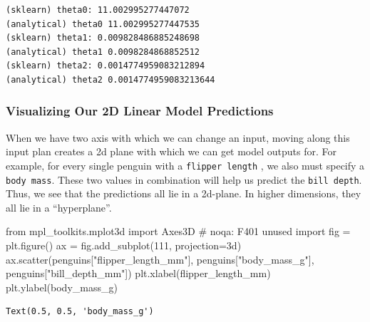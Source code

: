 \documentclass[
  letterpaper,
  DIV=11,
  numbers=noendperiod]{scrreprt}
\newenvironment{Shaded}{\begin{snugshade}}{\end{snugshade}}
\newcommand{\CommentTok}[1]{\textcolor[rgb]{0.37,0.37,0.37}{#1}}
\newcommand{\DecValTok}[1]{\textcolor[rgb]{0.68,0.00,0.00}{#1}}
\newcommand{\ImportTok}[1]{\textcolor[rgb]{0.00,0.46,0.62}{#1}}
\newcommand{\NormalTok}[1]{\textcolor[rgb]{0.00,0.23,0.31}{#1}}
\newcommand{\OperatorTok}[1]{\textcolor[rgb]{0.37,0.37,0.37}{#1}}
\newcommand{\StringTok}[1]{\textcolor[rgb]{0.13,0.47,0.30}{#1}}
\begin{document}
\begin{verbatim}
(sklearn) theta0: 11.002995277447072
(analytical) theta0 11.002995277447535
(sklearn) theta1: 0.009828486885248698
(analytical) theta1 0.0098284868852512
(sklearn) theta2: 0.0014774959083212894
(analytical) theta2 0.0014774959083213644
\end{verbatim}

\hypertarget{visualizing-our-2d-linear-model-predictions}{%
\subsubsection{Visualizing Our 2D Linear Model
Predictions}\label{visualizing-our-2d-linear-model-predictions}}

When we have two axis with which we can change an input, moving along
this input plan creates a 2d plane with which we can get model outputs
for. For example, for every single penguin with a
\texttt{flipper\ length} , we also must specify a \texttt{body\ mass}.
These two values in combination will help us predict the
\texttt{bill\ depth}. Thus, we see that the predictions all lie in a
2d-plane. In higher dimensions, they all lie in a ``hyperplane''.

\begin{Shaded}
\begin{Highlighting}[]
\ImportTok{from}\NormalTok{ mpl\_toolkits.mplot3d }\ImportTok{import}\NormalTok{ Axes3D  }\CommentTok{\# noqa: F401 unused import}
\NormalTok{fig }\OperatorTok{=}\NormalTok{ plt.figure()}
\NormalTok{ax }\OperatorTok{=}\NormalTok{ fig.add\_subplot(}\DecValTok{111}\NormalTok{, projection}\OperatorTok{=}\StringTok{\textquotesingle{}3d\textquotesingle{}}\NormalTok{)}
\NormalTok{ax.scatter(penguins[}\StringTok{"flipper\_length\_mm"}\NormalTok{], penguins[}\StringTok{"body\_mass\_g"}\NormalTok{], penguins[}\StringTok{"bill\_depth\_mm"}\NormalTok{])}
\NormalTok{plt.xlabel(}\StringTok{\textquotesingle{}flipper\_length\_mm\textquotesingle{}}\NormalTok{)}
\NormalTok{plt.ylabel(}\StringTok{\textquotesingle{}body\_mass\_g\textquotesingle{}}\NormalTok{)}
\end{Highlighting}
\end{Shaded}

\begin{verbatim}
Text(0.5, 0.5, 'body_mass_g')
\end{verbatim}
\end{document}
